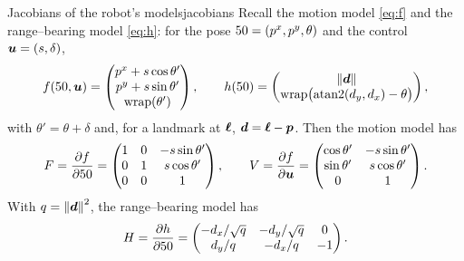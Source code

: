 \begin{proposition}{Jacobians of the robot's models}{jacobians}
Recall the motion model \eqref{eq:f} and the range--bearing model
\eqref{eq:h}: for the pose $50=(p^x,p^y,\theta)$ and the control
$\bm{u}=(s,\delta)$,
\[
  f(50,\bm{u})=\begin{pmatrix}p^x+s\cos\theta'\\p^y+s\sin\theta'\\
  \operatorname{wrap}(\theta')\end{pmatrix},\qquad
  h(50)=\begin{pmatrix}\left\lVert \bm{d}\right\rVert\\
  \operatorname{wrap}\bigl(\operatorname{atan2}(d_y,d_x)-\theta\bigr)\end{pmatrix},
\]
with $\theta'=\theta+\delta$ and, for a landmark at $\bm{\ell}$,
$\bm{d}=\bm{\ell}-\bm{p}$. Then the motion model has
\[
  F=\frac{\partial f}{\partial50}=\begin{pmatrix}1&0&-s\sin\theta'\\
  0&1&s\cos\theta'\\0&0&1\end{pmatrix},\qquad
  V=\frac{\partial f}{\partial\bm{u}}=\begin{pmatrix}\cos\theta'&
  -s\sin\theta'\\\sin\theta'&s\cos\theta'\\0&1\end{pmatrix}.
\]
With $q=\left\lVert \bm{d}\right\rVert^2$, the range--bearing model has
\[
  H=\frac{\partial h}{\partial50}=\begin{pmatrix}-d_x/\sqrt q&-d_y/\sqrt q
  &0\\ d_y/q&-d_x/q&-1\end{pmatrix}.
\]
\end{proposition}

